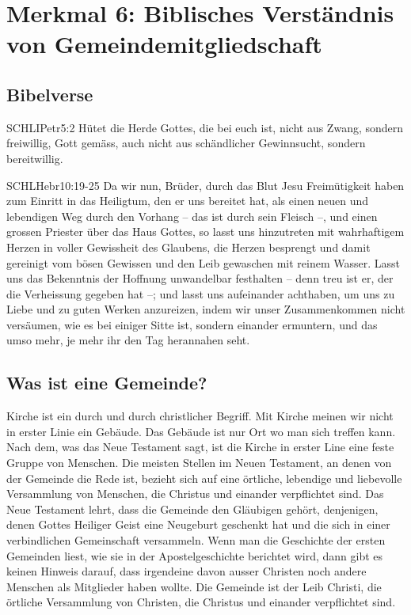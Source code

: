 \documentclass{../../inc/mybib}
\begin{document}
\section{Merkmal 6: Biblisches Verständnis von Gemeindemitgliedschaft}
\subsection{Bibelverse}
\begin{bibelbox}{SCHL}{IPetr}{5:2}
    Hütet die Herde Gottes, die bei euch ist, nicht aus Zwang, sondern freiwillig, Gott gemäss, auch nicht aus schändlicher Gewinnsucht, sondern bereitwillig.
\end{bibelbox}
\begin{bibelbox}{SCHL}{Hebr}{10:19-25}
    Da wir nun, Brüder, durch das Blut Jesu Freimütigkeit haben zum Einritt in das Heiligtum, den er uns bereitet hat, als einen neuen und lebendigen Weg durch den Vorhang -- das ist durch sein Fleisch --, und einen grossen Priester über das Haus Gottes, so lasst uns hinzutreten mit wahrhaftigem Herzen in voller Gewissheit des Glaubens, die Herzen besprengt und damit gereinigt vom bösen Gewissen und den Leib gewaschen mit reinem Wasser. Lasst uns das Bekenntnis der Hoffnung unwandelbar festhalten -- denn treu ist er, der die Verheissung gegeben hat --; und lasst uns aufeinander achthaben, um uns zu Liebe und zu guten Werken anzureizen, indem wir unser Zusammenkommen nicht versäumen, wie es bei einiger Sitte ist, sondern einander ermuntern, und das umso mehr, je mehr ihr den Tag herannahen seht. 
\end{bibelbox}
\subsection{Was ist eine Gemeinde? }
Kirche ist ein durch und durch christlicher Begriff. Mit Kirche meinen wir nicht in erster Linie ein Gebäude. Das Gebäude ist nur Ort wo man sich treffen kann. Nach dem, was das Neue Testament sagt, ist die Kirche in erster Line eine feste Gruppe von Menschen. Die meisten Stellen im Neuen Testament, an denen von der Gemeinde die Rede ist, bezieht sich auf eine örtliche, lebendige und liebevolle Versammlung von Menschen, die Christus und einander verpflichtet sind. Das Neue Testament lehrt, dass die Gemeinde den Gläubigen gehört, denjenigen, denen Gottes Heiliger Geist eine Neugeburt geschenkt hat und die sich in einer verbindlichen Gemeinschaft versammeln. Wenn man die Geschichte der ersten Gemeinden liest, wie sie in der Apostelgeschichte berichtet wird, dann gibt es keinen Hinweis darauf, dass irgendeine davon ausser Christen noch andere Menschen als Mitglieder haben wollte. Die Gemeinde ist der Leib Christi, die örtliche Versammlung von Christen, die Christus und einander verpflichtet sind.
\end{document}
